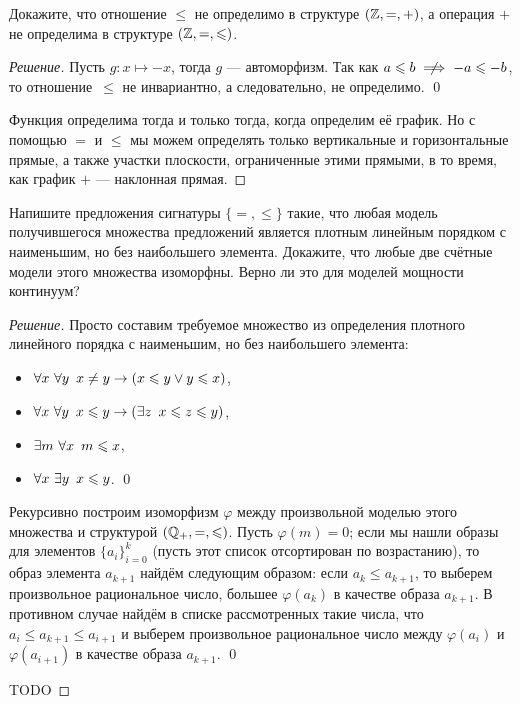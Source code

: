     \begin{problem}[4]
        Докажите, что отношение \(\leqslant\) не определимо в структуре \((\mathbb{Z}, =, +)\), а операция \(+\) не определима в структуре \((\mathbb{Z}, =, \leqslant)\).
    \end{problem}
    \begin{proof}[Решение]
        Пусть \(g \colon x \mapsto -x\), тогда \(g\) --- автоморфизм. Так как \(a \leqslant b \centernot\implies -a \leqslant -b\), то отношение~\(\leqslant\) не инвариантно, а следовательно, не определимо. \qed

        Функция определима тогда и только тогда, когда определим её график. Но с помощью \(=\) и \(\leqslant\) мы можем определять только вертикальные и горизонтальные прямые, а также участки плоскости, ограниченные этими прямыми, в то время, как график \(+\) --- наклонная прямая.
    \end{proof}

    \begin{problem}[5]
        Напишите предложения сигнатуры \(\{=, \leqslant\}\) такие, что любая модель получившегося множества предложений является плотным линейным порядком с наименьшим, но без наибольшего элемента. Докажите, что любые две счётные модели этого множества изоморфны. Верно ли это для моделей мощности континуум?
    \end{problem}
    \begin{proof}[Решение]
        Просто составим требуемое множество из определения плотного линейного порядка с наименьшим, но без наибольшего элемента:
        \begin{itemize}
            \item \(\forall x \ \forall y \enskip x \neq y \to (x \leqslant y \lor y \leqslant x)\),
            \item \(\forall x \ \forall y \enskip x \leqslant y \to (\exists z \enskip x \leqslant z \leqslant y)\),
            \item \(\exists m \ \forall x \enskip m \leqslant x\),
            \item \(\forall x \ \exists y \enskip x \leqslant y\). \qed
        \end{itemize}
        
        Рекурсивно построим изоморфизм \(\varphi\) между произвольной моделью этого множества и структурой \((\mathbb{Q}_+, =, \leqslant)\). Пусть \(\varphi(m) = 0\); если мы нашли образы для элементов \(\{a_i\}_{i=0}^k\) (пусть этот список отсортирован по возрастанию), то образ элемента \(a_{k+1}\) найдём следующим образом: если \(a_k \leqslant a_{k+1}\), то выберем произвольное рациональное число, большее \(\varphi(a_k)\) в качестве образа \(a_{k+1}\). В противном случае найдём в списке рассмотренных такие числа, что \(a_i \leqslant a_{k+1} \leqslant a_{i+1}\) и выберем произвольное рациональное число между \(\varphi(a_i)\) и \(\varphi(a_{i+1})\) в качестве образа \(a_{k+1}\). \qed

        TODO
    \end{proof}
